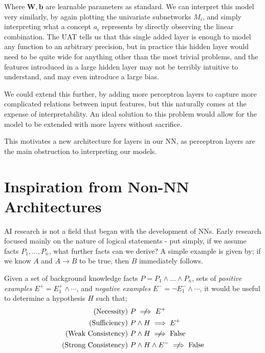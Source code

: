 \documentclass[conference]{report}
\begin{document}
Where $\mathbf{W}, \mathbf{b}$ are learnable parameters as standard. We can interpret this model very similarly, by again plotting the univariate subnetworks $M_i$, and simply interpreting what a concept $a_i$ represents by directly observing the linear combination. The UAT tells us that this single added layer is enough to model any function to an arbitrary precision, but in practice this hidden layer would need to be quite wide for anything other than the most trivial problems, and the features introduced in a large hidden layer may not be terribly intuitive to understand, and may even introduce a large bias.

We could extend this further, by adding more perceptron layers to capture more complicated relations between input features, but this naturally comes at the expense of interpretability. An ideal solution to this problem would allow for the model to be extended with more layers without sacrifice.

This motivates a new architecture for layers in our NN, as perceptron layers are the main obstruction to interpreting our models.

\section{Inspiration from Non-NN Architectures}

AI research is not a field that began with the development of NNs. Early research focused mainly on the nature of logical statements - put simply, if we assume facts $P_1, \dots, P_n$, what further facts can we derive? A simple example is given by; if we know $A$ and $A \rightarrow B$ to be true, then $B$ immediately follows.

Given a set of background knowledge facts $P = P_1 \land \dots \land P_n$, sets of \textit{positive examples} $E^+=E^+_1\land \cdots$, and \textit{negative examples} $E^-=\lnot E^-_1 \land \cdots$, it would be useful to determine a hypothesis $H$ such that;
$$
\begin{aligned}
    \text{(Necessity) } &P \centernot\implies E^+ \\
    \text{(Sufficiency) } &P \land H \implies E^+ \\
    \text{(Weak Consistency) } &P \land H \centernot\implies \text{False} \\ 
    \text{(Strong Consistency) } &P \land H \land E^- \centernot\implies \text{False} \\
\end{aligned}
$$
\end{document}
